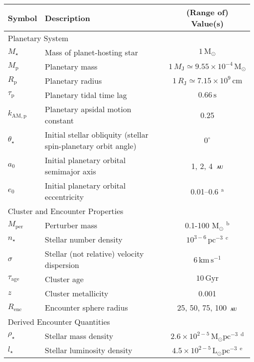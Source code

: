 \documentclass[iop,usenatbib]{emulateapj}
\newcommand{\msun}{\mathrm{M}_\odot}
\newcommand{\lsun}{\mathrm{L}_\odot}
\newcommand{\au}{\,\textsc{au}}
\newcommand{\renc}{R_\mathrm{enc}}
\newcommand{\mper}{M_\mathrm{per}}
\begin{document}
 
\begin{table}
\begin{threeparttable}
\begin{tabular}{lp{3.2cm}c}
\toprule
Symbol & Description & (Range of) Value(s) \\
\toprule
\multicolumn{3}{l}{Planetary System} \\
\midrule
$M_\star$					& Mass of planet-hosting star					& $1 \, \msun$ \\
$M_\mathrm{p}$			& Planetary mass							& $1 \, M_\mathrm{J}\simeq9.55\times10^{-4}\,\msun$ \\
$R_\mathrm{p}$			& Planetary radius							& $1 \, R_\mathrm{J}\simeq7.15\times10^9\,\mathrm{cm}$ \\
$\tau_\mathrm{p}$        		& Planetary tidal time lag		                    		& $0.66 \, \mathrm{s}$ \\
$k_\mathrm{AM,p}$           	& Planetary apsidal motion constant                    	& 0.25 \\
$\theta_\star$          			& Initial stellar obliquity (stellar spin-planetary orbit angle)  		& $0^\circ$ \\
$a_0$                       			& Initial planetary orbital semimajor axis 			& 1, 2, 4 $\au$ \\
$e_0$                       			& Initial planetary orbital eccentricity 				& 0.01--0.6 ${}^\mathrm{a}$ \\
\toprule
\multicolumn{3}{l}{Cluster and Encounter Properties} \\
\midrule
$\mper$                   	& Perturber mass                  					& 0.1-100 $\mathrm{M}_\odot$ ${}^\mathrm{b}$ \\
$n_\star$ 					& Stellar number density						& $10^{3-6} \, \mathrm{pc^{-3}} $ ${}^\mathrm{c}$ \\
$\sigma$ 					& Stellar (not relative) velocity dispersion 			& $6\,\mathrm{km \, s^{-1}}$ \\
$\tau_\mathrm{age}$ 		& Cluster age 								& $10 \,\mathrm{Gyr}$ \\
$z$						& Cluster metallicity							& 0.001 \\
$\renc$ 			& Encounter sphere radius					& 25, 50, 75, 100 $\au$ \\
\midrule
\multicolumn{3}{l}{Derived Encounter Quantities} \\
\midrule
$\rho_\star$ 				& Stellar mass density 						& $2.6 \times 10^{2-5} \, \msun \mathrm{pc^{-3}}$ ${}^\mathrm{d}$ \\
$l_\star$					& Stellar luminosity density					& $4.5 \times 10^{2-5} \, \lsun \mathrm{pc^{-3}}$ ${}^\mathrm{e}$ \\

\end{tabular}
\end{threeparttable}
\end{table}
\end{document}
